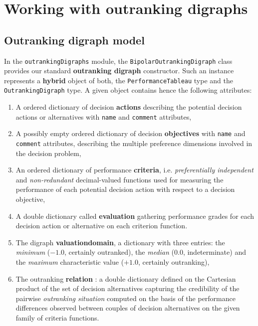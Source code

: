 \chapter{Working with outranking digraphs}
\label{sec:3}



\section{Outranking digraph model}
\label{sec:3.1}

In the {\tt outrankingDigraphs} module, the {\tt BipolarOutrankingDigraph} class provides our standard {\bf outranking digraph} constructor. Such an instance represents a {\bf hybrid} object of both, the {\tt PerformanceTableau} type and the {\tt OutrankingDigraph} type. A given object contains hence the following attributes:
\begin{enumerate}
\item A ordered dictionary of decision {\bf actions} describing the potential decision actions or alternatives with {\tt name} and {\tt comment} attributes,
\item A possibly empty ordered dictionary of decision {\bf objectives} with {\tt name} and {\tt comment} attributes, describing the multiple preference dimensions involved in the decision problem, 
\item An ordered dictionary of performance {\bf criteria}, i.e. {\em preferentially independent\/} and {\em non-redundant\/} decimal-valued functions used for measuring the performance of each potential decision action with respect to a decision objective,
\item A double dictionary called {\bf evaluation} gathering performance grades for each decision action or alternative on each criterion function. 
\item The digraph {\bf valuationdomain}, a dictionary with three entries: the {\em minimum\/} ($-1.0$, certainly outranked), the {\em median\/} ($0.0$, indeterminate) and the {\em maximum\/} characteristic value ($+1.0$, certainly outranking),
\item The outranking {\bf relation} : a double dictionary defined on the Cartesian product of the set of decision alternatives capturing the credibility of the pairwise {\em outranking situation\/} computed on the basis of the performance differences observed between couples of decision alternatives on the given family of criteria functions.   
\end{enumerate}

